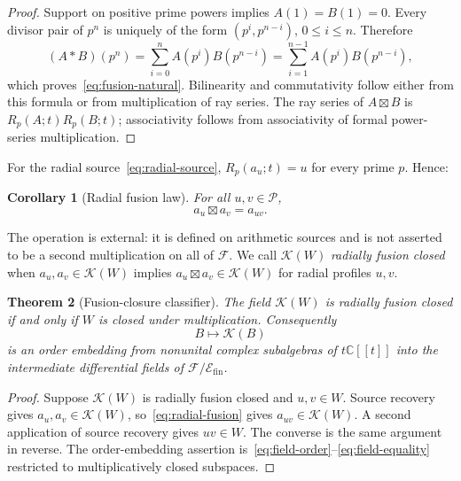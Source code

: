 \documentclass[11pt]{article}
\newtheorem{theorem}{Theorem}[section]
\newtheorem{corollary}[theorem]{Corollary}
\theoremstyle{definition}
\theoremstyle{remark}
\newcommand{\C}{\mathbb C}
\newcommand{\F}{\mathcal F}
\newcommand{\Efin}{\mathcal E_{\mathrm{fin}}}
\newcommand{\Pcal}{\mathcal P}
\newcommand{\K}{\mathcal K}
\begin{document}
\begin{proof}
Support on positive prime powers implies $A(1)=B(1)=0$.  Every divisor pair of $p^n$ is uniquely
of the form $(p^i,p^{n-i})$, $0\le i\le n$.  Therefore
\[
 (A*B)(p^n)=\sum_{i=0}^nA(p^i)B(p^{n-i})
             =\sum_{i=1}^{n-1}A(p^i)B(p^{n-i}),
\]
which proves~\eqref{eq:fusion-natural}.  Bilinearity and commutativity follow either from this
formula or from multiplication of ray series.  The ray series of $A\boxtimes B$ is
$R_p(A;t)R_p(B;t)$; associativity follows from associativity of formal power-series multiplication.
\end{proof}

For the radial source~\eqref{eq:radial-source}, $R_p(a_u;t)=u$ for every prime $p$.  Hence:

\begin{corollary}[Radial fusion law]\label{cor:radial-fusion}
For all $u,v\in\Pcal$,
\begin{equation}\label{eq:radial-fusion}
 a_u\boxtimes a_v=a_{uv}.
\end{equation}
\end{corollary}

The operation is external: it is defined on arithmetic sources and is not asserted to be a
second multiplication on all of $\F$.  We call $\K(W)$ \emph{radially fusion closed} when
$a_u,a_v\in\K(W)$ implies $a_u\boxtimes a_v\in\K(W)$ for radial profiles $u,v$.

\begin{theorem}[Fusion-closure classifier]\label{thm:fusion-classifier}
The field $\K(W)$ is radially fusion closed if and only if $W$ is closed under multiplication.
Consequently
\begin{equation}\label{eq:fusion-order-embedding}
 B\longmapsto\K(B)
\end{equation}
is an order embedding from nonunital complex subalgebras of $t\C[[t]]$ into the intermediate
differential fields of $\F/\Efin$.
\end{theorem}

\begin{proof}
Suppose $\K(W)$ is radially fusion closed and $u,v\in W$.  Source recovery gives
$a_u,a_v\in\K(W)$, so~\eqref{eq:radial-fusion} gives $a_{uv}\in\K(W)$.  A second application of
source recovery gives $uv\in W$.  The converse is the same argument in reverse.  The
order-embedding assertion is~\eqref{eq:field-order}--\eqref{eq:field-equality} restricted to
multiplicatively closed subspaces.
\end{proof}
\end{document}
